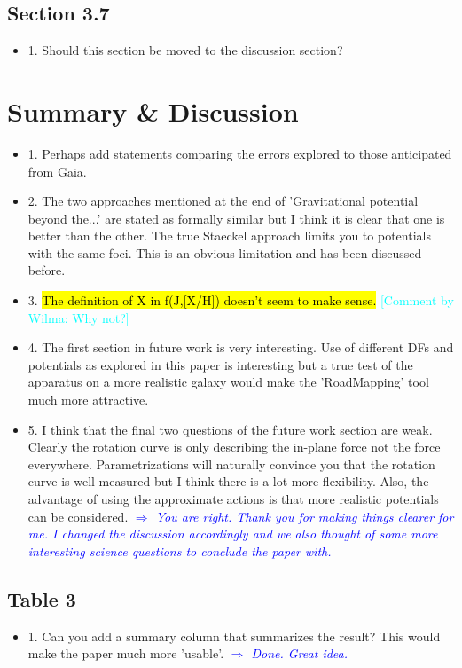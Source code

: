 \documentclass[10pt,a4paper]{article}
\newcommand{\HW}[1]{\textcolor{Cyan}{#1}}
\newcommand{\Comment}[1]{\textsl{\textcolor{Blue}{$\Longrightarrow$ {#1}}}}
\begin{document}
\subsection{Section 3.7}
\begin{itemize}
\item 1. Should this section be moved to the discussion section?
\end{itemize}

\section{Summary \& Discussion}
\begin{itemize}
\item 1. Perhaps add statements comparing the errors explored to those anticipated from Gaia.
\item 2. The two approaches mentioned at the end of 'Gravitational potential beyond the...' are stated as formally similar but I think it is clear that one is better than the other. The true Staeckel approach limits you to potentials with the same foci. This is an obvious limitation and has been discussed before.
\item 3. \hl{The definition of X in f(J,[X/H]) doesn't seem to make sense.} \HW{[Comment by Wilma: Why not?]}
\item 4. The first section in future work is very interesting. Use of different DFs and potentials as explored in this paper is interesting but a true test of the apparatus on a more realistic galaxy would make the 'RoadMapping' tool much more attractive.
\item 5. I think that the final two questions of the future work section are weak. Clearly the rotation curve is only describing the in-plane force not the force everywhere. Parametrizations will naturally convince you that the rotation curve is well measured but I think there is a lot more flexibility. Also, the advantage of using the approximate actions is that more realistic potentials can be considered. \Comment{You are right. Thank you for making things clearer for me. I changed the discussion accordingly and we also thought of some more interesting science questions to conclude the paper with.}
\end{itemize}

\subsection{Table 3}
\begin{itemize}
\item 1. Can you add a summary column that summarizes the result? This would make the paper much more 'usable'. \Comment{Done. Great idea.}
\end{itemize}
\end{document}

